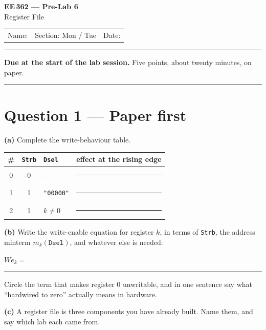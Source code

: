 \documentclass[11pt]{article}
\newcommand{\code}[1]{\texttt{#1}}
\newcommand{\answerbox}[1]{\vspace{2pt}\fbox{\parbox[c][#1][c]{\dimexpr\linewidth-2\fboxsep-2\fboxrule}{\ }}\vspace{4pt}}
\begin{document}
\begin{center}
{\Large\bfseries EE\,362 --- Pre-Lab 6}\\[2pt]
{\large Register File}\\[6pt]
\begin{tabular}{@{}p{6.5cm}p{4cm}p{4cm}@{}}
Name: \hrulefill & Section: Mon / Tue & Date: \hrulefill
\end{tabular}
\end{center}

\vspace{2pt}\hrule\vspace{4pt}

{\small\textbf{Due at the start of the lab session.} Five points, about twenty
minutes, on paper.}

\vspace{4pt}\hrule

\section*{Question 1 --- Paper first}

\textbf{(a)} Complete the write-behaviour table.

\begin{center}
\begin{tabular}{ccl@{\hskip 8pt}||@{\hskip 8pt}l}
\toprule
\# & \code{Strb} & \code{Dsel} & effect at the rising edge \\
\midrule
0 & 0 & --- & \rule{6cm}{0.4pt} \\[5pt]
1 & 1 & \code{"00000"} & \rule{6cm}{0.4pt} \\[5pt]
2 & 1 & $k \neq 0$ & \rule{6cm}{0.4pt} \\
\bottomrule
\end{tabular}
\end{center}

\textbf{(b)} Write the write-enable equation for register $k$, in terms of
\code{Strb}, the address minterm $m_k(\code{Dsel})$, and whatever else is needed:

\vspace{6pt}
$\mathit{We}_k = $ \rule{10cm}{0.4pt}
\vspace{8pt}

Circle the term that makes register 0 unwritable, and in one sentence say what
``hardwired to zero'' actually means in hardware.

\answerbox{1.6cm}

\textbf{(c)} A register file is three components you have already built. Name
them, and say which lab each came from.
\end{document}
